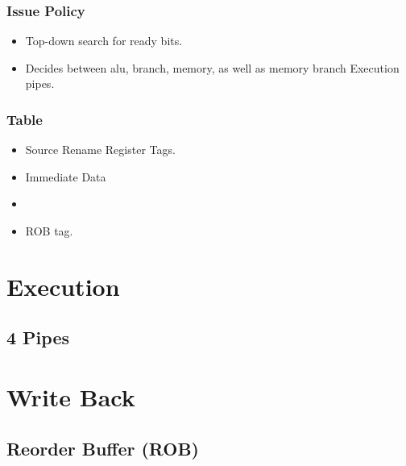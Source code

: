\documentclass{article}
\begin{document}
\subsubsection{Issue Policy}
\begin{itemize}
\item Top-down search for ready bits.
\item Decides between alu, branch, memory, as well as memory branch Execution pipes.
\end{itemize}
\subsubsection{Table}
\begin{itemize}
\item Source Rename Register Tags.
\item Immediate Data
\item 
\item ROB tag.
\end{itemize}

\section{Execution}
\subsection{4 Pipes}

\section{Write Back}
\subsection{Reorder Buffer (ROB)}
\end{document}
